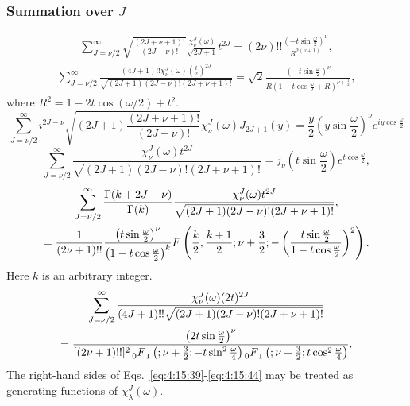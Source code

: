 \subsubsection{ Summation over $J$}

\begin{gather}
\sum_{J=\nu / 2}^{\infty} \sqrt{\frac{(2 J+\nu+1)!}{(2J-\nu)!}}
\frac{\chi_{\nu}^{J}(\omega)}{\sqrt{2J+1}}{t}^{2J}=(2\nu)!! \frac{\left(-t \sin \frac{\omega}{2}\right)^{\nu}}{R^{2(\nu+1)}}, \label{eq:4:15:39}
\end{gather}
\begin{gather}
\sum_{J=\nu / 2}^{\infty} \frac{(4 J+1)!!\chi_{\nu}^{J}(\omega)\left(\frac{t}{2}\right)^{2 J}}{\sqrt{(2 J+1)(2 J-\nu)!(2 J+\nu+1)!}}=\sqrt{2} \frac{\left(-t \sin \frac{\omega}{2}\right)^{\nu}}{R\left(1-t \cos \frac{\omega}{2}+R\right)^{\nu+\frac{1}{2}}}, \label{eq:4:15:40}
\end{gather}
where $R^{2}=1-2 t \cos (\omega / 2)+t^{2}$.
\begin{equation}
\sum_{J=\nu / 2}^{\infty} i^{2 J-\nu} \sqrt{(2 J+1) \frac{(2 J+\nu+1)!}{(2 J-\nu)!}} \chi_{\nu}^{J}(\omega) J_{2 J+1}(y)=\frac{y}{2}\left(y \sin \frac{\omega}{2}\right)^{\nu} e^{i y \cos \frac{\omega}{2}} \label{eq:4:15:41}
\end{equation}
\begin{equation}
\sum_{J=\nu / 2}^{\infty} \frac{\chi_{\nu}^{J}(\omega) t^{2 J}}{\sqrt{(2 J+1)(2 J-\nu)!(2 J+\nu+1)!}}=j_{\nu}\left(t \sin \frac{\omega}{2}\right) e^{t \cos \frac{\omega}{2}} ,\label{eq:4:15:42}
\end{equation}
\begin{gather}
\sum_{J=\nu / 2}^{\infty} \frac{\Gamma(k+2 J-\nu)}{\Gamma(k)} \frac{\chi_{\nu}^{J}(\omega) t^{2 J}}{\sqrt{(2 J+1)(2 J-\nu)!(2 J+\nu+1)!}} , \notag\\
=\frac{1}{(2 \nu+1)!!} \frac{\left(t \sin \frac{\omega}{2}\right)^{\nu}}{\left(1-t \cos \frac{\omega}{2}\right)^{k}} F\left(\frac{k}{2}, \frac{k+1}{2} ; \nu+\frac{3}{2} ;-\left(\frac{t \sin \frac{\omega}{2}}{1-t \cos \frac{\omega}{2}}\right)^{2}\right) . \label{eq:4:15:43}
\end{gather}
Here $k$ is an arbitrary integer.
\begin{multline}
\sum_{J=\nu / 2}^{\infty} \frac{\chi_{\nu}^{J}(\omega)(2 t)^{2 J}}{(4 J+1)!!\sqrt{(2 J+1)(2 J-\nu)!(2 J+\nu+1)!}}  \\
=\frac{\left(2 t \sin \frac{\omega}{2}\right)^{\nu}}{[(2 \nu+1)!!]^{2} \prescript{}{0}{F}_{1}^{}\left(; \nu+\frac{3}{2} ;-t \sin ^{2} \frac{\omega}{4}\right)\prescript{}{0}{F}_{1}^{}\left(; \nu+\frac{3}{2} ; t \cos ^{2} \frac{\omega}{4}\right) }. \label{eq:4:15:44}
\end{multline}
The right-hand sides of Eqs.~\eqref{eq:4:15:39}-\eqref{eq:4:15:44} may be treated as generating functions of $\chi_{\lambda}^{J}(\omega)$.

